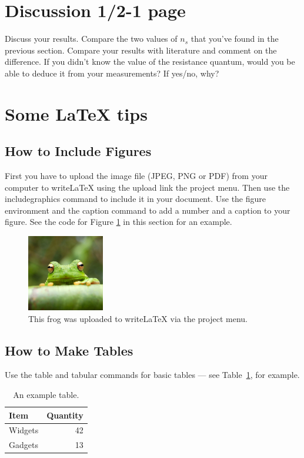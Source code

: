 \documentclass[a4paper]{article}
\begin{document}
\section{Discussion 1/2-1 page}
Discuss your results. Compare the two values of $n_{s}$ that you've found in the previous section. Compare your results with literature and comment on the difference. If you didn't know the value of the resistance quantum, would you be able to deduce it from your measurements? If yes/no, why?

\newpage
\section{Some LaTeX tips}
\label{sec:latex}
\subsection{How to Include Figures}

First you have to upload the image file (JPEG, PNG or PDF) from your computer to writeLaTeX using the upload link the project menu. Then use the includegraphics command to include it in your document. Use the figure environment and the caption command to add a number and a caption to your figure. See the code for Figure \ref{fig:frog} in this section for an example.

\begin{figure}
\centering
\includegraphics[width=0.3\textwidth]{frog.jpg}
\caption{\label{fig:frog}This frog was uploaded to writeLaTeX via the project menu.}
\end{figure}

\subsection{How to Make Tables}

Use the table and tabular commands for basic tables --- see Table~\ref{tab:widgets}, for example.

\begin{table}
\centering
\begin{tabular}{l|r}
Item & Quantity \\\hline
Widgets & 42 \\
Gadgets & 13
\end{tabular}
\caption{\label{tab:widgets}An example table.}
\end{table}
\end{document}
